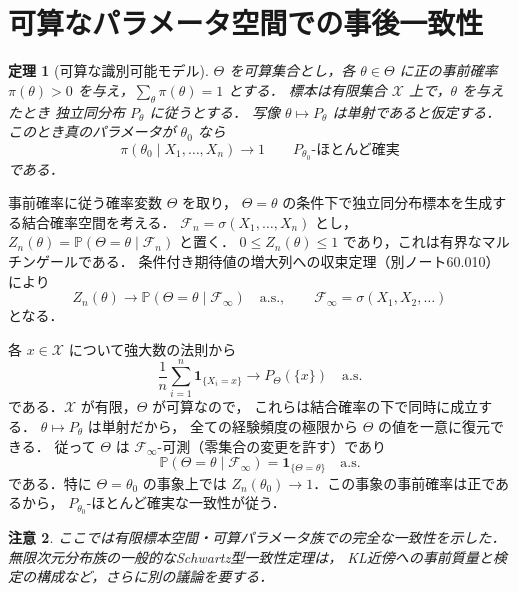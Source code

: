 \documentclass[a5paper,10pt,onecolumn]{jsarticle}
\makeatletter
\theoremstyle{mathnotetheorem}
\newtheorem{theorem}{定理}[section]
\newtheorem{remark}[theorem]{注意}
\renewcommand{\proofname}{証明}
\renewenvironment{proof}[1][\proofname]{%
  \par\pushQED{\qed}\normalfont\topsep4\p@\@plus2\p@\relax
  \trivlist\item[\hskip\labelsep\bfseries #1]\ignorespaces
}{\popQED\endtrivlist\@endpefalse}
\makeatother
\begin{document}
\section{可算なパラメータ空間での事後一致性}
\begin{theorem}[可算な識別可能モデル]
$\Theta$ を可算集合とし，各 $\theta\in\Theta$ に正の事前確率
$\pi(\theta)>0$ を与え，$\sum_\theta\pi(\theta)=1$ とする．
標本は有限集合 $\mathcal X$ 上で，$\theta$ を与えたとき
独立同分布 $P_\theta$ に従うとする．
写像 $\theta\mapsto P_\theta$ は単射であると仮定する．
このとき真のパラメータが $\theta_0$ なら
\[
 \pi(\theta_0\mid X_1,\ldots,X_n)\longrightarrow1
 \qquad P_{\theta_0}\text{-ほとんど確実}
\]
である．
\end{theorem}
\begin{proof}
事前確率に従う確率変数 $\Theta$ を取り，
$\Theta=\theta$ の条件下で独立同分布標本を生成する結合確率空間を考える．
$\mathcal F_n=\sigma(X_1,\ldots,X_n)$ とし，
$Z_n(\theta)=\mathbb P(\Theta=\theta\mid\mathcal F_n)$ と置く．
$0\le Z_n(\theta)\le1$ であり，これは有界なマルチンゲールである．
条件付き期待値の増大列への収束定理（別ノート60.010）により
\[
 Z_n(\theta)\longrightarrow
 \mathbb P(\Theta=\theta\mid\mathcal F_\infty)
 \quad\text{a.s.},\qquad
 \mathcal F_\infty=\sigma(X_1,X_2,\ldots)
\]
となる．

各 $x\in\mathcal X$ について強大数の法則から
\[
 \frac1n\sum_{i=1}^n\mathbf1_{\{X_i=x\}}
 \longrightarrow P_\Theta(\{x\})\quad\text{a.s.}
\]
である．$\mathcal X$ が有限，$\Theta$ が可算なので，
これらは結合確率の下で同時に成立する．
$\theta\mapsto P_\theta$ は単射だから，
全ての経験頻度の極限から $\Theta$ の値を一意に復元できる．
従って $\Theta$ は $\mathcal F_\infty$-可測（零集合の変更を許す）であり
\[
 \mathbb P(\Theta=\theta\mid\mathcal F_\infty)
 =\mathbf1_{\{\Theta=\theta\}}\quad\text{a.s.}
\]
である．特に $\Theta=\theta_0$ の事象上では
$Z_n(\theta_0)\to1$．この事象の事前確率は正であるから，
$P_{\theta_0}$-ほとんど確実な一致性が従う．
\end{proof}
\begin{remark}
ここでは有限標本空間・可算パラメータ族での完全な一致性を示した．
無限次元分布族の一般的なSchwartz型一致性定理は，
KL近傍への事前質量と検定の構成など，さらに別の議論を要する．
\end{remark}
\end{document}
